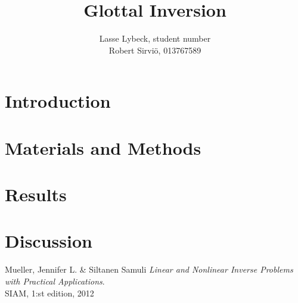 \documentclass[12pt,a4]{article}
\title{Glottal Inversion}
\author{Lasse Lybeck, student number\\Robert Sirviö, 013767589}
\begin{document}
\maketitle

\section{Introduction}\label{sec:intro}


\section{Materials and Methods}\label{sec:methods}


\section{Results}\label{sec:results}


\section{Discussion}\label{sec:discussion}


\begin{thebibliography}{9}
	Mueller, Jennifer L. \& Siltanen Samuli \emph{Linear and Nonlinear Inverse Problems with Practical Applications}.\\
	SIAM, 1:st edition, 2012

\end{thebibliography}
\end{document}
